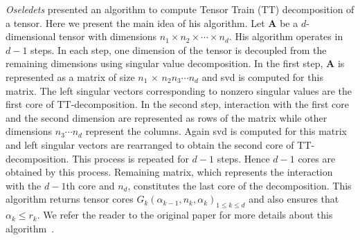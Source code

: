 \documentclass[runningheads]{llncs}
\newcommand{\tensor}[1]{\cal\textbf{#1}\xspace}
\begin{document}

\noindent \textit{Oseledets} presented an algorithm to compute Tensor Train (TT) decomposition of a tensor. Here we present the main idea of his algorithm. Let \tensor{A} be a $d$-dimensional tensor with dimensions $n_1 \times n_2 \times \cdots \times n_d$. His algorithm operates in $d-1$ steps. In each step, one dimension of the tensor is decoupled from the remaining dimensions using singular value decomposition. In the first step, \tensor{A} is represented as a matrix of size $n_1$ $\times$ $n_2 n_3 \cdots n_d$ and svd is computed for this matrix. The left singular vectors corresponding to nonzero singular values are the first core of TT-decomposition. In the second step, interaction with the first core and the second dimension are represented as rows of the matrix while other dimensions $n_3\cdots n_d$ represent the columns. Again svd is computed for this matrix and left singular vectors are rearranged to obtain the second core of TT-decomposition. This process is repeated for $d-1$ steps. Hence $d-1$ cores are obtained by this process. Remaining matrix, which represents the interaction with the $d-1$th core and $n_d$, constitutes the last core of the decomposition. This algorithm returns tensor cores $G_k(\alpha_{k-1}, n_k, \alpha_k) _{1\le k\le d}$ and also ensures that $\alpha_k \le r_k$. We refer the reader to the original paper for more details about this algorithm~\cite{tt}. 

\end{document}
